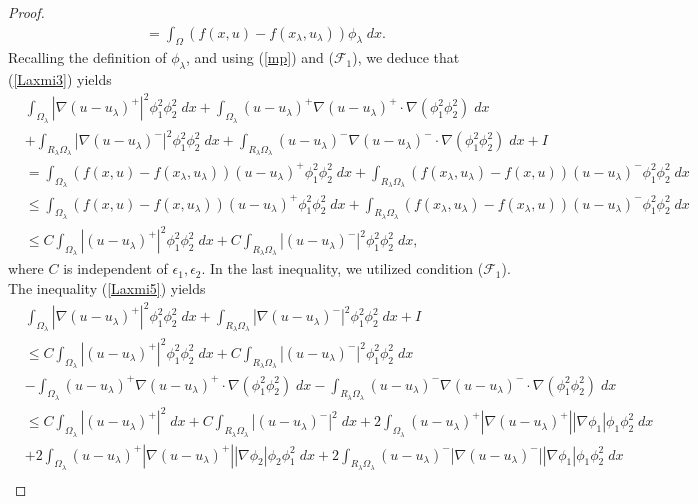 \documentclass[11pt, notitlepage]{article}
\begin{document}
{\begin{proof}
\begin{align}
    &=\int_\Omega (f(x,u)-f(x_\lambda,u_\lambda))\phi_\lambda\;dx.
\end{align}
Recalling the definition of $\phi_\lambda$, and using (\ref{mp}) and ($\mathscr{F}_1$), we deduce that (\ref{Laxmi3}) yields
\begin{align}\label{Laxmi5}
    &\int_{\Omega_\lambda}|\nabla(u-u_\lambda)^+|^2\phi_1^2\phi_2^2\;dx+\int_{\Omega_\lambda}(u-u_\lambda)^+\nabla(u-u_\lambda)^+\cdot\nabla(\phi_1^2\phi_2^2)\;dx\nonumber\\
    &+\int_{R_\lambda\Omega_\lambda}|\nabla(u-u_\lambda)^-|^2\phi_1^2\phi_2^2\;dx+\int_{R_\lambda\Omega_\lambda}(u-u_\lambda)^-\nabla(u-u_\lambda)^-\cdot\nabla(\phi_1^2\phi_2^2)\;dx+I\nonumber\\
    &= \int_{\Omega_\lambda} (f(x,u)-f(x_\lambda,u_\lambda))(u-u_\lambda)^+\phi_1^2\phi_2^2\;dx+\int_{R_\lambda\Omega_\lambda} (f(x_\lambda,u_\lambda)-f(x,u))(u-u_\lambda)^-\phi_1^2\phi_2^2\;dx\nonumber\\
    &\leq \int_{\Omega_\lambda} (f(x,u)-f(x,u_\lambda))(u-u_\lambda)^+\phi_1^2\phi_2^2\;dx+\int_{R_\lambda\Omega_\lambda} (f(x_\lambda,u_\lambda)-f(x_\lambda,u))(u-u_\lambda)^-\phi_1^2\phi_2^2\;dx\nonumber\\
    &\leq C\int_{\Omega_\lambda} |(u-u_\lambda)^+|^2\phi_1^2\phi_2^2\;dx+C\int_{R_\lambda\Omega_\lambda} |(u-u_\lambda)^-|^2\phi_1^2\phi_2^2\;dx,
\end{align}
where $C$ is independent of $\epsilon_1,\epsilon_2$. In the last inequality, we utilized condition ($\mathscr{F}_1$). The inequality (\ref{Laxmi5}) yields
\begin{align}\label{Laxmi4}
 &\int_{\Omega_\lambda}|\nabla(u-u_\lambda)^+|^2\phi_1^2\phi_2^2\;dx+\int_{R_\lambda\Omega_\lambda}|\nabla(u-u_\lambda)^-|^2\phi_1^2\phi_2^2\;dx+I\nonumber\\
  &\leq C\int_{\Omega_\lambda} |(u-u_\lambda)^+|^2\phi_1^2\phi_2^2\;dx+C\int_{R_\lambda\Omega_\lambda} |(u-u_\lambda)^-|^2\phi_1^2\phi_2^2\;dx\nonumber\\
  &-\int_{\Omega_\lambda}(u-u_\lambda)^+\nabla(u-u_\lambda)^+\cdot\nabla(\phi_1^2\phi_2^2)\;dx-\int_{R_\lambda\Omega_\lambda}(u-u_\lambda)^-\nabla(u-u_\lambda)^-\cdot\nabla(\phi_1^2\phi_2^2)\;dx  \nonumber\\
  &\leq C\int_{\Omega_\lambda} |(u-u_\lambda)^+|^2\;dx+C\int_{R_\lambda\Omega_\lambda} |(u-u_\lambda)^-|^2\;dx+2\int_{\Omega_\lambda}(u-u_\lambda)^+|\nabla(u-u_\lambda)^+||\nabla\phi_1|\phi_1\phi_2^2\;dx\nonumber\\
  &+2\int_{\Omega_\lambda}(u-u_\lambda)^+|\nabla(u-u_\lambda)^+||\nabla\phi_2|\phi_2\phi_1^2\;dx+2\int_{R_\lambda\Omega_\lambda}(u-u_\lambda)^-|\nabla(u-u_\lambda)^-||\nabla\phi_1|\phi_1\phi_2^2\;dx  \nonumber\\

\end{align}
\end{proof}}
\end{document}
